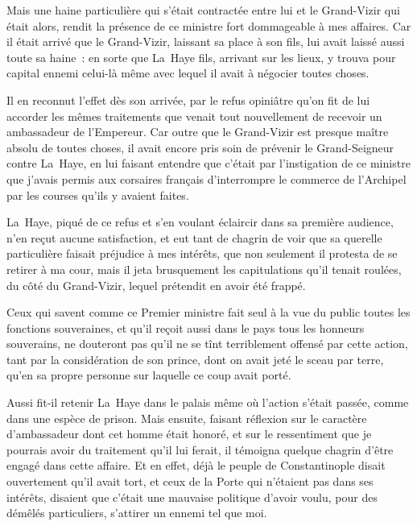 \documentclass[french,twoside]{book} %
\begin{document}
Mais une haine particulière qui s’était contractée entre lui et le Grand-Vizir qui était alors, rendit la présence de ce ministre fort dommageable à mes affaires. Car il était arrivé que le Grand-Vizir, laissant sa place à son fils, lui avait laissé aussi toute sa haine : en sorte que La Haye fils, arrivant sur les lieux, y trouva pour capital ennemi celui-là même avec lequel il avait à négocier toutes choses.\par
Il en reconnut l’effet dès son arrivée, par le refus opiniâtre qu’on fit de lui accorder les mêmes traitements que venait tout nouvellement de recevoir un ambassadeur de l’Empereur. Car outre que le Grand-Vizir est presque maître absolu de toutes choses, il avait encore pris soin de prévenir le Grand-Seigneur contre La Haye, en lui faisant entendre que c’était par l’instigation de ce ministre que j’avais permis aux corsaires français d’interrompre le commerce de l’Archipel par les courses qu’ils y avaient faites.\par
La Haye, piqué de ce refus et s’en voulant éclaircir dans sa première audience, n’en reçut aucune satisfaction, et eut tant de chagrin de voir que sa querelle particulière faisait préjudice à mes intérêts, que non seulement il protesta de se retirer à ma cour, mais il jeta brusquement les capitulations qu’il tenait roulées, du côté du Grand-Vizir, lequel prétendit en avoir été frappé.\par
Ceux qui savent comme ce Premier ministre fait seul à la vue du public toutes les fonctions souveraines, et qu’il reçoit aussi dans le pays tous les honneurs souverains, ne douteront pas qu’il ne se tînt terriblement offensé par cette action, tant par la considération de son prince, dont on avait jeté le sceau par terre, qu’en sa propre personne sur laquelle ce coup avait porté.\par
Aussi fit-il retenir La Haye dans le palais même où l’action s’était passée, comme dans une espèce de prison. Mais ensuite, faisant réflexion sur le caractère d’ambassadeur dont cet homme était honoré, et sur le ressentiment que je pourrais avoir du traitement qu’il lui ferait, il témoigna quelque chagrin d’être engagé dans cette affaire. Et en effet, déjà le peuple de Constantinople disait ouvertement qu’il avait tort, et ceux de la Porte qui n’étaient pas dans ses intérêts, disaient que c’était une mauvaise politique d’avoir voulu, pour des démêlés particuliers, s’attirer un ennemi tel que moi.\par
\end{document}
